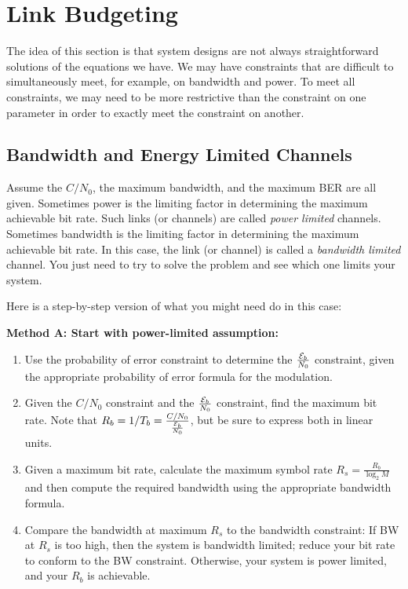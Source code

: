 



\section{Link Budgeting}

The idea of this section is that system designs are not always straightforward solutions of the equations we have.  We may have constraints that are difficult to simultaneously meet, for example, on bandwidth and power.  To meet all constraints, we may need to be more restrictive than the constraint on one parameter in order to exactly meet the constraint on another.

\subsection{Bandwidth and Energy Limited Channels}

Assume the $C/N_0$, the maximum bandwidth, and the maximum BER are all given.  
Sometimes power is the limiting factor in determining the maximum
achievable bit rate. Such links (or channels) are called \emph{power
limited} channels. Sometimes bandwidth is the limiting factor in
determining the maximum achievable bit rate. In this case, the link
(or channel) is called a \emph{bandwidth limited} channel.  You just
need to try to solve the problem and see which one limits your
system.

Here is a step-by-step version of what you might need do in this case:

\textbf{Method A: Start with power-limited assumption:}
\begin{enumerate}
  \item Use the probability of error constraint to determine the
    $\frac{\mathcal{E}_b}{N_0}$ constraint, given the appropriate probability of error
    formula for the modulation.
  \item Given the $C/N_0$ constraint and the $\frac{\mathcal{E}_b}{N_0}$ constraint,
    find the maximum bit rate.  Note that $R_b = 1/T_b = \frac{C/N_0}{\frac{\mathcal{E}_b}{N_0}}$,
    but be sure to express both in linear units.
  \item Given a maximum bit rate, calculate the maximum symbol rate
    $R_s = \frac{R_b}{\log_2 M}$ and then compute the required bandwidth
    using the appropriate bandwidth formula.
  \item  Compare the bandwidth at maximum $R_s$ to the bandwidth
    constraint:  If BW at $R_s$ is too high, then the system is
    bandwidth limited; reduce your bit rate to conform to the BW constraint.
    Otherwise, your system is power limited, and your $R_b$ is
    achievable.
\end{enumerate}

